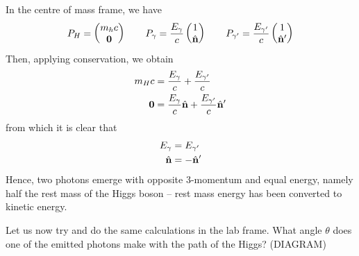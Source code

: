 \documentclass{../template/note}
\begin{document}
    In the centre of mass frame, we have
    \begin{align*}
        P_H = \begin{pmatrix}
            m_hc \\
            \V 0 \\
        \end{pmatrix} \qquad P_\gamma = \frac{E_\gamma}{c} \begin{pmatrix}
            1 \\
            \hvec n \\
        \end{pmatrix} \qquad P_{\gamma'} = \frac{E_{\gamma'}}{c} \begin{pmatrix}
            1 \\
            \hvec n' \\
        \end{pmatrix}
    \end{align*}
    Then, applying conservation, we obtain
    \begin{align*}
        m_H c &= \frac{E_\gamma}{c} + \frac{E_{\gamma'}}{c}\\ 
        \V 0 &= \frac{E_{\gamma}}{c} \hvec n + \frac{E_{\gamma'}}{c} \hvec n'
    \end{align*}
    from which it is clear that
    \begin{align*}
        E_\gamma &= E_{\gamma'} \\
        \hvec n &= -\hvec n'
    \end{align*}
    Hence, two photons emerge with opposite 3-momentum and equal energy, namely half the rest mass of the Higgs boson -- rest mass energy has been converted to kinetic energy.

    Let us now try and do the same calculations in the lab frame. What angle \(\theta\) does one of the emitted photons make with the path of the Higgs? (DIAGRAM)
\end{document}
